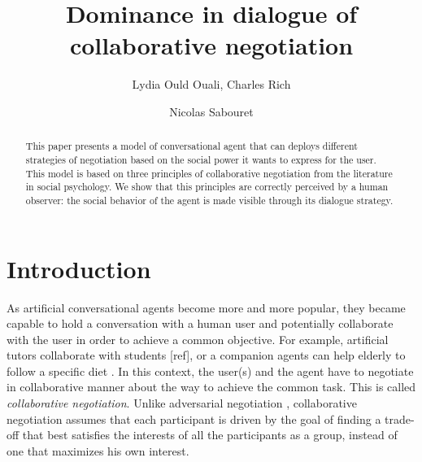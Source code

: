 \documentclass{article}
\begin{document}
	\title{\vskip -10pt Dominance in dialogue of collaborative negotiation}
	
	\author{Lydia Ould Ouali, Charles Rich \and
		Nicolas Sabouret }
	

	\maketitle
	
	\begin{abstract}
		This paper presents a model of conversational agent that can deploys different strategies of negotiation based on the social power it wants to express for the user. This model is based on three principles of collaborative negotiation from the literature in social psychology. We show that this principles are correctly perceived by a human observer: the social behavior of the agent is made visible through its dialogue strategy.
	\end{abstract}
	
	\section{Introduction}
	As artificial conversational agents become more and more popular, they became capable to hold a conversation with a human user and potentially collaborate with the user in order to achieve a common objective. For example, artificial tutors collaborate with students [ref], or a companion agents can help elderly to follow a specific diet \cite{kidd2005sociable}. In this context, the user(s) and the agent have to negotiate in collaborative manner about the way to achieve the common task. This is called \emph{collaborative negotiation}. Unlike adversarial negotiation \cite{traum2008multi}, collaborative negotiation assumes that each participant is driven by the goal of finding a trade-off that best satisfies the interests of all the participants as a group, instead of one that maximizes his own interest\cite{sidnerartificial,chu1995response}.
	
\end{document}
